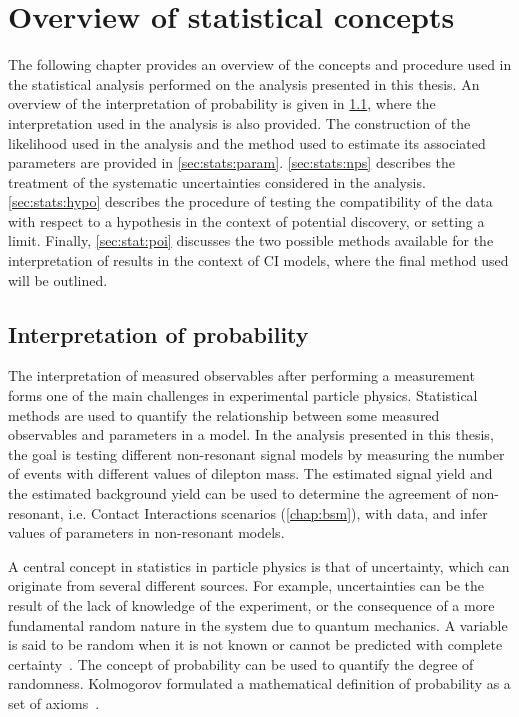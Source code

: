 \chapter{Overview of statistical concepts}\label{chap:stats}
The following chapter provides an overview of the concepts and procedure used in the statistical analysis performed on the analysis presented in this thesis. An overview of the interpretation of probability is given in \cref{sec:stats:interp}, where the interpretation used in the analysis is also provided. The construction of the likelihood used in the analysis and the method used to estimate its associated parameters are provided in \cref{sec:stats:param}. \cref{sec:stats:nps} describes the treatment of the systematic uncertainties considered in the analysis. \cref{sec:stats:hypo} describes the procedure of testing the compatibility of the data with respect to a hypothesis in the context of potential discovery, or setting a limit. Finally, \cref{sec:stat:poi} discusses the two possible methods available for the interpretation of results in the context of CI models, where the final method used will be outlined.

\section{Interpretation of probability}\label{sec:stats:interp}
The interpretation of measured observables after performing a measurement forms one of the main challenges in experimental particle physics. Statistical methods are used to quantify the relationship between some measured observables and parameters in a model. In the analysis presented in this thesis, the goal is testing different non-resonant signal models by measuring the number of events with different values of dilepton mass. The estimated signal yield and the estimated background yield can be used to determine the agreement of non-resonant, i.e. Contact Interactions scenarios (\cref{chap:bsm}), with data, and infer values of parameters in non-resonant models. 
  
A central concept in statistics in particle physics is that of uncertainty, which can originate from several different sources. For example, uncertainties can be the result of the lack of knowledge of the experiment, or the consequence of a more fundamental random nature in the system due to quantum mechanics. A variable is said to be random when it is not known or cannot be predicted with complete certainty~\cite{Cowan1998}. The concept of probability can be used to quantify the degree of randomness. Kolmogorov formulated a mathematical definition of probability as a set of axioms~\cite{Kol33}. 

